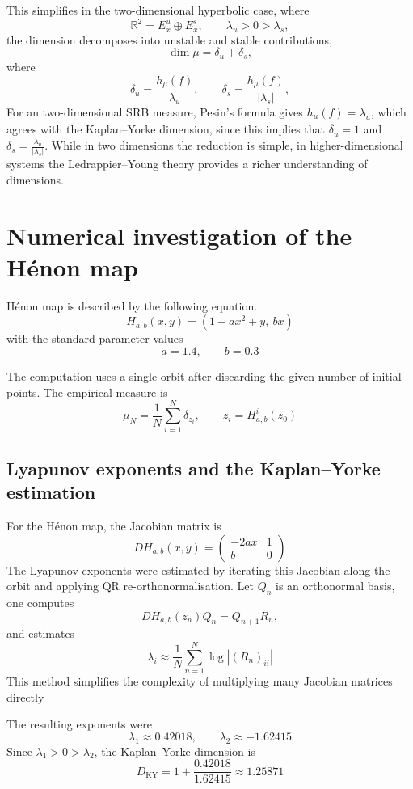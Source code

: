 \documentclass[11pt,a4paper]{article}
\begin{document}
\noindent This simplifies in the two-dimensional hyperbolic case, where
\[
	\mathbb R^2 = E_x^u \oplus E_x^s,
	\qquad
	\lambda_u > 0 > \lambda_s,
\]
the dimension decomposes into unstable and stable contributions,
\[
	\dim \mu = \delta_u + \delta_s,
\]
where
\[
	\delta_u = \frac{h_\mu(f)}{\lambda _u},
	\qquad
	\delta_s = \frac{h_\mu(f)}{|\lambda _s|},
\]
For an two-dimensional SRB measure, Pesin's formula gives \(h_\mu(f) = \lambda_u\), which agrees with the Kaplan--Yorke dimension, since this implies that \(\delta_u =1\) and \(\delta_s = \frac{\lambda _u}{|\lambda _s |}\).
While in two dimensions the reduction is simple, in higher-dimensional systems the Ledrappier--Young theory provides a richer understanding of dimensions.

\section{Numerical investigation of the H\'enon map}

H\'enon map is described by the following equation.
\[
	H_{a,b}(x,y)=(1-a x^2+y,\ bx)
\]
with the standard parameter values
\[
	a=1.4, \qquad b=0.3
\]

The computation uses a single orbit after discarding the given number of initial points.  The empirical measure is
\[
	\mu_N=\frac1N\sum_{i=1}^N\delta_{z_i},
	\qquad z_i=H_{a,b}^i(z_0)
\]

\subsection{Lyapunov exponents and the Kaplan--Yorke estimation}

For the H\'enon map, the Jacobian matrix is
\[
	DH_{a,b}(x,y)=
	\begin{pmatrix}
		-2ax & 1 \\
		b    & 0
	\end{pmatrix}
\]
The Lyapunov exponents were estimated by iterating this Jacobian along the orbit and applying QR re-orthonormalisation. Let \(Q_n\) is an orthonormal basis, one computes
\[
	DH_{a,b}(z_n)Q_n = Q_{n+1}R_n,
\]
and estimates
\[
	\lambda_i \approx \frac1N\sum_{n=1}^N \log |(R_n)_{ii}|
\]
This method simplifies the complexity of multiplying many Jacobian matrices directly

The resulting exponents were
\[
	\lambda_1\approx 0.42018,
	\qquad
	\lambda_2\approx -1.62415
\]
Since \(\lambda_1>0>\lambda_2\), the Kaplan--Yorke dimension is
\[
	D_{\mathrm{KY}}
	=1+\frac{0.42018}{1.62415}
	\approx 1.25871
\]
\end{document}
